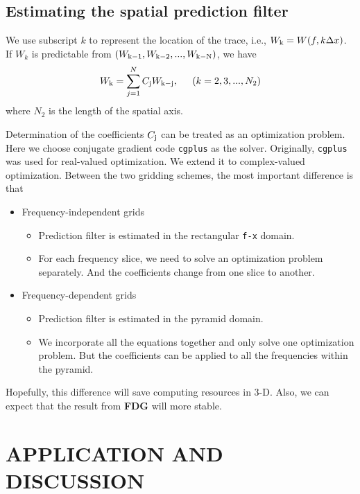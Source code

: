 \subsection{Estimating the spatial prediction filter}
\par
We use subscript $k$ to represent the location of the trace, 
i.e., $W_{\rm k} = W(f,k\Delta x)$. If $W_k$ is predictable from $(W_{\rm k-1}, 
W_{\rm k-2}, ..., W_{\rm k-N})$, we have
\begin{equation}
	W_{\rm k} = \sum_{j=1}^N C_{\rm j} W_{\rm k-j}, \hspace*{0.2in}(k=2,3,...,N_2)
\end{equation}
where $N_2$ is the length of the spatial axis.
\par
Determination of the coefficients $C_{\rm j}$ can be treated as an optimization
 problem. Here we choose conjugate gradient code {\tt cgplus} 
\cite[]{Claerbout.tdf.82} as the solver. Originally, {\tt cgplus} was used for 
real-valued optimization. We extend it to complex-valued optimization.  
Between the two gridding schemes, the most important difference is that
\begin{itemize}

	\item Frequency-independent grids
	\begin{itemize}
		\item Prediction filter is estimated in the rectangular 
		{\tt f-x} domain.
		\item For each frequency slice, we need to solve an 
		optimization problem separately. And the coefficients change 
		from one slice to another.
	\end{itemize}
	\item Frequency-dependent grids
	\begin{itemize}
		\item Prediction filter is estimated in the pyramid domain.
		\item We incorporate all the equations together and only solve 
		one optimization problem. But the coefficients can be applied 
		to all the frequencies within the pyramid. 
	\end{itemize}
\end{itemize}
Hopefully, this difference will save computing resources in 3-D. Also, we can 
expect that the result from {\bf FDG} will more stable.


\section{APPLICATION AND DISCUSSION}

